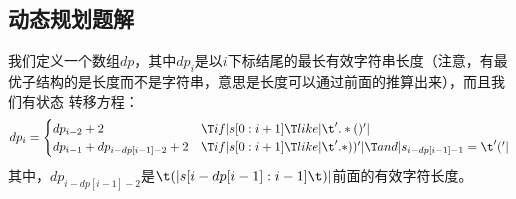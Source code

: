 \subsection{动态规划题解}

我们定义一个数组$dp$，其中$dp_i$是以$i$下标结尾的最长有效字符串长度（注意，有最
优子结构的是长度而不是字符串，意思是长度可以通过前面的推算出来），而且我们有状态
转移方程：$$dp_i = \begin{cases}
    dp_{i-2} + 2                    & \T if | s[0:i+1]\T like|\t'.*()'| \\
    dp_{i-1} + dp_{i-dp[i-1]-2} + 2 & \T if | s[0:i+1]\T like|\t'.*))'|
                                      \T and | s_{i-dp[i-1]-1}=\t'('|
\end{cases}$$
其中，$dp_{i-dp[i-1]-2}$是$\t(|s[i-dp[i-1]:i-1]\t)|$前面的有效字符长度。


